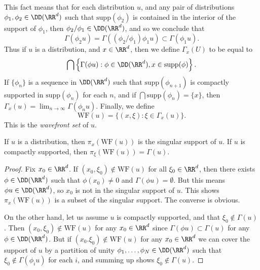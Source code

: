 This fact means that for each distribution $u$, and any pair of distributions $\phi_1,\phi_2 \in \DD(\RR^d)$ such that $\text{supp}(\phi_2)$ is contained in the interior of the support of $\phi_1$, then $\phi_2/\phi_1 \in \DD(\RR^d)$, and so we conclude that
%
\[ \Gamma(\phi_2 u) = \Gamma((\phi_2/\phi_1) \phi_1 u) \subset \Gamma(\phi_1 u). \]
%
Thus if $u$ is a distribution, and $x \in \RR^d$, then we define $\Gamma_x(U)$ to be equal to
%
\[ \bigcap \left\{ \Gamma(\phi u) : \phi \in \DD(\RR^d), x \in \text{supp}(\phi) \right\}. \]
%
If $\{ \phi_n \}$ is a sequence in $\DD(\RR^d)$ such that $\text{supp}(\phi_{n+1})$ is compactly supported in $\text{supp}(\phi_n)$ for each $n$, and if $\bigcap \text{supp}(\phi_n) = \{ x \}$, then $\Gamma_x(u) = \lim_{n \to \infty} \Gamma(\phi_n u)$. Finally, we define
%
\[ \text{WF}(u) = \{ (x,\xi): \xi \in \Gamma_x(u) \}. \]
%
This is the \emph{wavefront set} of $u$.


\begin{lemma}
    If $u$ is a distribution, then $\pi_x(\text{WF}(u))$ is the singular support of $u$. If $u$ is compactly supported, then $\pi_\xi(\text{WF}(u)) = \Gamma(u)$.
\end{lemma}
\begin{proof}
    Fix $x_0 \in \RR^d$. If $(x_0,\xi_0) \not \in \text{WF}(u)$ for all $\xi_0 \in \RR^d$, then there exists $\phi \in \DD(\RR^d)$ such that $\phi(x_0) \neq 0$ and $\Gamma(\phi u) = \emptyset$. But this means $\phi u \in \DD(\RR^d)$, so $x_0$ is not in the singular support of $u$. This shows $\pi_x(\text{WF}(u))$ is a subset of the singular support. The converse is obvious.

    On the other hand, let us assume $u$ is compactly supported, and that $\xi_0 \not \in \Gamma(u)$. Then $(x_0,\xi_0) \not \in \text{WF}(u)$ for any $x_0 \in \RR^d$ since $\Gamma(\phi u) \subset \Gamma(u)$ for any $\phi \in \DD(\RR^d)$. But if $(x_0.\xi_0) \not \in \text{WF}(u)$ for any $x_0 \in \RR^d$ we can cover the support of $u$ by a partition of unity $\phi_1,\dots,\phi_N \in \DD(\RR^d)$ such that $\xi_0 \not \in \Gamma(\phi_i u)$ for each $i$, and summing up shows $\xi_0 \not \in \Gamma(u)$.
\end{proof}

